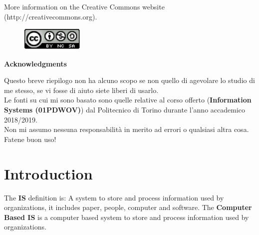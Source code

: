 \documentclass[12pt]{article}
\begin{document}
\noindent More information on the Creative Commons website (http://creativecommons.org).

\begin{figure}[h!]
  \centering
  \includegraphics[width=3cm]{images/license.png}
\end{figure}

{\noindent \Large \textbf{Acknowledgments}\bigskip}

Questo breve riepilogo non ha alcuno scopo se non quello di agevolare lo studio di me stesso, se vi fosse di aiuto siete liberi di usarlo.\\
Le fonti su cui mi sono basato sono quelle relative al corso offerto (\textbf{Information Systems (01PDWOV)}) dal Politecnico di Torino durante l'anno accademico 2018/2019.\\
Non mi assumo nessuna responsabilità in merito ad errori o qualsiasi altra cosa. Fatene buon uso!
\newpage

\section{Introduction}
The \textbf{IS} definition is: A system to store and process information used by organizations, it includes paper, people, computer and software. The \textbf{Computer Based IS} is a computer based system to store and process information used by organizations.
\end{document}
